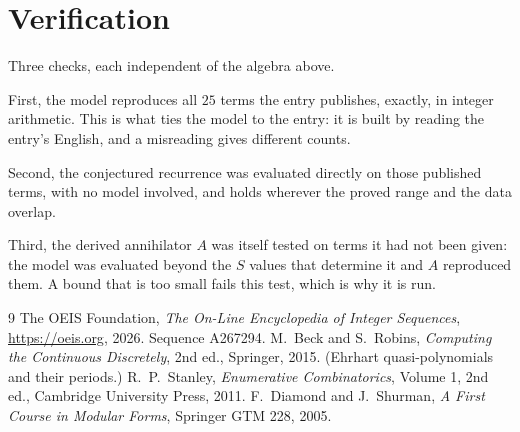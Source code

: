 \documentclass[11pt,a4paper]{article}
\theoremstyle{plain}
\theoremstyle{definition}
\begin{document}
\section{Verification}

Three checks, each independent of the algebra above.

First, the model reproduces all $25$ terms the entry publishes, exactly, in integer
arithmetic. This is what ties the model to the entry: it is built by reading the entry's
English, and a misreading gives different counts.

Second, the conjectured recurrence was evaluated directly on those published terms, with no
model involved, and holds wherever the proved range and the data overlap.

Third, the derived annihilator $A$ was itself tested on terms it had not been given: the model
was evaluated beyond the $S$ values that determine it and $A$ reproduced them. A bound that is
too small fails this test, which is why it is run.

\begin{thebibliography}{9}
 The OEIS Foundation, \emph{The On-Line Encyclopedia of Integer
Sequences}, \url{https://oeis.org}, 2026. Sequence A267294.
 M.~Beck and S.~Robins, \emph{Computing the Continuous Discretely},
2nd ed., Springer, 2015. (Ehrhart quasi-polynomials and their periods.)
 R.~P.~Stanley, \emph{Enumerative Combinatorics}, Volume 1, 2nd ed.,
Cambridge University Press, 2011.
 F.~Diamond and J.~Shurman, \emph{A First Course in Modular Forms},
Springer GTM 228, 2005.
\end{thebibliography}
\end{document}
